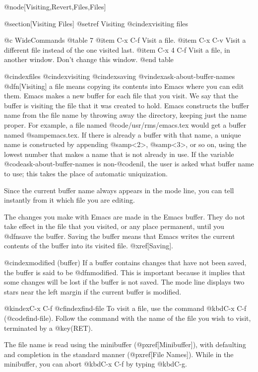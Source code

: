 {{{{{{{{{{{{{{{{{{@node[Visiting,Revert,Files,Files]

@section[Visiting Files]
@setref Visiting
@cindex{visiting files}

@c WideCommands
@table 7
@item C-x C-f
Visit a file.
@item C-x C-v
Visit a different file instead of the one visited last.
@item C-x 4 C-f
Visit a file, in another window.  Don't change this window.
@end table

@cindex{files}
@cindex{visiting}
@cindex{saving}
@vindex{ask-about-buffer-names}
  @dfn[Visiting] a file means copying its contents into Emacs where you can
edit them.  Emacs makes a new buffer for each file that you visit.  We say
that the buffer is visiting the file that it was created to hold.
Emacs constructs the buffer name from the file name by throwing away the
directory, keeping just the name proper.  For example, a file named
@code{/usr/rms/emacs.tex} would get a buffer named @samp{emacs.tex}.  If
there is already a buffer with that name, a unique name is constructed by
appending @samp{<2>}, @samp{<3>}, or so on, using the lowest number that  
makes a name that is not already in use.  If the variable
@code{ask-about-buffer-names} is non-@code{nil}, the user is asked what
buffer name to use; this takes the place of automatic uniquization.

  Since the current buffer name always appears in the mode line, you can
tell instantly from it which file you are editing.

  The changes you make with Emacs are made in the Emacs buffer.  They do
not take effect in the file that you visited, or any place permanent, until
you @dfn{save} the buffer.  Saving the buffer means that Emacs writes the
current contents of the buffer into its visited file.  @xref[Saving].

@cindex{modified (buffer)}
  If a buffer contains changes that have not been saved, the buffer is said
to be @dfn{modified}.  This is important because it implies that some
changes will be lost if the buffer is not saved.  The mode line displays
two stars near the left margin if the current buffer is modified.

@kindex{C-x C-f}
@cfindex{find-file}
  To visit a file, use the command @kbd{C-x C-f} (@code{find-file}).
Follow the command with the name of the file you wish to visit, terminated
by a @key(RET).

  The file name is read using the minibuffer (@pxref[Minibuffer]), with
defaulting and completion in the standard manner (@pxref[File Names]).
While in the minibuffer, you can abort @kbd{C-x C-f} by typing @kbd{C-g}.

}}}}}}}}}}}}}}}}}}
